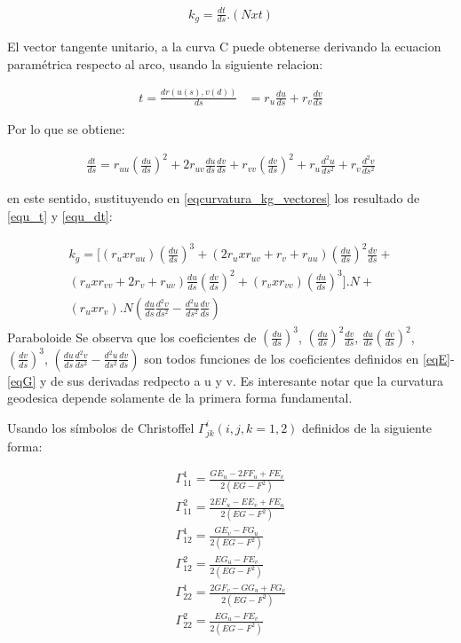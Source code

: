 \documentclass{endm}
\begin{document}
\begin{align} 
k_g = \frac{dt}{ds} . (N x t)
 \label{eqcurvatura_kg_vectores}
\end{align}

El vector tangente unitario, a la curva C puede obtenerse derivando la ecuacion param\'etrica respecto al arco, usando la siguiente relacion:

\begin{align} 
t = \frac{d r(u(s), v(d))}{ds}&=r_u \frac{d u}{ds} + r_v \frac{d v}{ds}
 \label{equ_t}
\end{align}

Por lo que se obtiene:

\begin{align} 
 \frac{d t}{ds} = r_{uu} (\frac{d u}{ds})^2 +
 2 r_{uv} \frac{d u}{ds} \frac{d v}{ds}
 + r_{vv} (\frac{d v}{ds})^2 +
 r_u \frac{d^2 u}{ds^2} +
 r_v \frac{d^2 v}{ds^2}
 \label{equ_dt}
\end{align}

en este sentido, sustituyendo en \ref{eqcurvatura_kg_vectores} los resultado de \ref{equ_t} y \ref{equ_dt}:

\begin{align} 
\begin{split}
k_g = [ 
(r_u x r_{uu}) (\frac{d u}{ds})^3 + 
(2 r_u x r_{uv} + r_v + r_{uu} ) (\frac{d u}{ds})^2 \frac{dv}{ds} + \\
(r_u x r_{vv} + 2 r_v + r_{uv})  \frac{d u}{ds} (\frac{d v}{ds})^2 + 
(r_v x r_{vv}) (\frac{d u}{ds})^3
] . N + \\
(r_u x r_{v}) . N (\frac{d u}{ds} \frac{d^2 v}{ds^2} - \frac{d^ 2 u}{ds^2 } \frac{d v}{ds})
\label{curvatura_conR}
\end{split}
\end{align}
Paraboloide 
Se observa que los coeficientes de $(\frac{d u}{ds})^3$, 
$(\frac{d u}{ds})^2 \frac{d v}{ds}$, $\frac{d u}{ds} (\frac{d v}{ds})^2$,  
$(\frac{d v}{ds})^3$,
$(\frac{d u}{ds} \frac{d^2 v}{ds^2} - \frac{d^2 u}{ds^2} \frac{d v}{ds} ) $
son todos funciones de los coeficientes definidos en \ref{eqE}-\ref{eqG} y de sus derivadas redpecto a u y v. Es interesante notar que la curvatura geodesica depende solamente de la primera forma fundamental.

Usando los s\'imbolos de Christoffel $\Gamma_{jk}^i (i,j,k=1,2)$ definidos de la siguiente forma:

\begin{align} 
\Gamma_{11}^1 = \frac{GE_u - 2 FF_u + FE_v}{2(EG - F^2)} \label{Gam_11_1}\\
\Gamma_{11}^2 = \frac{2EF_u - EE_v + FE_u}{2(EG - F^2)}\label{Gam_11_2}\\
\Gamma_{12}^1 = \frac{GE_v - FG_u}{2(EG - F^2)} \label{Gam_12_1}\\
\Gamma_{12}^2 = \frac{EG_u - FE_v}{2(EG - F^2)}\label{Gam_12_2}\\
\Gamma_{22}^1 = \frac{2GF_v - GG_u + FG_v}{2(EG - F^2)} \label{Gam_22_1}\\
\Gamma_{22}^2 = \frac{EG_u - FE_v}{2(EG - F^2)}\label{Gam_22_2}
\end{align}
\end{document}

